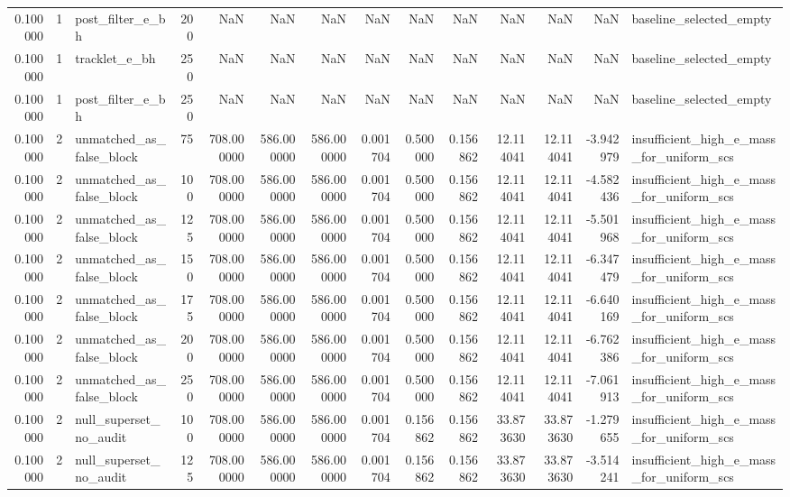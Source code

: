 \begin{tabular}{rrlrrrrrrrrrrl}
0.100000 & 1 & post_filter_e_bh & 200 & NaN & NaN & NaN & NaN & NaN & NaN & NaN & NaN & NaN & baseline_selected_empty \\
0.100000 & 1 & tracklet_e_bh & 250 & NaN & NaN & NaN & NaN & NaN & NaN & NaN & NaN & NaN & baseline_selected_empty \\
0.100000 & 1 & post_filter_e_bh & 250 & NaN & NaN & NaN & NaN & NaN & NaN & NaN & NaN & NaN & baseline_selected_empty \\
0.100000 & 2 & unmatched_as_false_block & 75 & 708.000000 & 586.000000 & 586.000000 & 0.001704 & 0.500000 & 0.156862 & 12.114041 & 12.114041 & -3.942979 & insufficient_high_e_mass_for_uniform_scs \\
0.100000 & 2 & unmatched_as_false_block & 100 & 708.000000 & 586.000000 & 586.000000 & 0.001704 & 0.500000 & 0.156862 & 12.114041 & 12.114041 & -4.582436 & insufficient_high_e_mass_for_uniform_scs \\
0.100000 & 2 & unmatched_as_false_block & 125 & 708.000000 & 586.000000 & 586.000000 & 0.001704 & 0.500000 & 0.156862 & 12.114041 & 12.114041 & -5.501968 & insufficient_high_e_mass_for_uniform_scs \\
0.100000 & 2 & unmatched_as_false_block & 150 & 708.000000 & 586.000000 & 586.000000 & 0.001704 & 0.500000 & 0.156862 & 12.114041 & 12.114041 & -6.347479 & insufficient_high_e_mass_for_uniform_scs \\
0.100000 & 2 & unmatched_as_false_block & 175 & 708.000000 & 586.000000 & 586.000000 & 0.001704 & 0.500000 & 0.156862 & 12.114041 & 12.114041 & -6.640169 & insufficient_high_e_mass_for_uniform_scs \\
0.100000 & 2 & unmatched_as_false_block & 200 & 708.000000 & 586.000000 & 586.000000 & 0.001704 & 0.500000 & 0.156862 & 12.114041 & 12.114041 & -6.762386 & insufficient_high_e_mass_for_uniform_scs \\
0.100000 & 2 & unmatched_as_false_block & 250 & 708.000000 & 586.000000 & 586.000000 & 0.001704 & 0.500000 & 0.156862 & 12.114041 & 12.114041 & -7.061913 & insufficient_high_e_mass_for_uniform_scs \\
0.100000 & 2 & null_superset_no_audit & 100 & 708.000000 & 586.000000 & 586.000000 & 0.001704 & 0.156862 & 0.156862 & 33.873630 & 33.873630 & -1.279655 & insufficient_high_e_mass_for_uniform_scs \\
0.100000 & 2 & null_superset_no_audit & 125 & 708.000000 & 586.000000 & 586.000000 & 0.001704 & 0.156862 & 0.156862 & 33.873630 & 33.873630 & -3.514241 & insufficient_high_e_mass_for_uniform_scs \\

\end{tabular}
